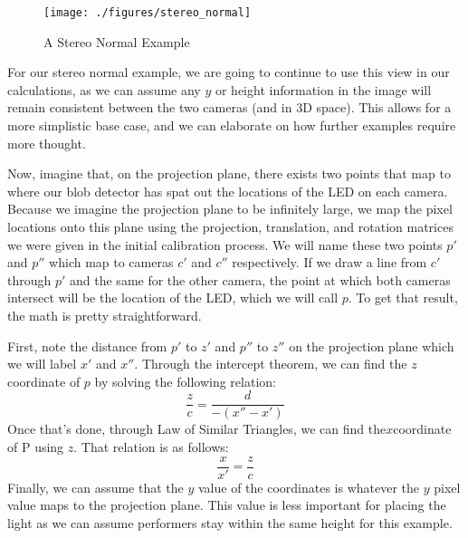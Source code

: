 \documentclass[
    12pt,
    twoside,
    bibstyle=chicago,
    headerstyle=uppercase,
	bibfile=thesis.bib
]{reedthesis}
\begin{document}
	\begin{figure}[h]
	   
	       \centering
	        
	    \texttt{[image: ./figures/stereo\_normal]}
	     \caption{A Stereo Normal Example}
	 \label{A Stereo Normal Example}
	\end{figure}

For our stereo normal example, we are going to continue to use this view in our calculations, as we can assume any $y$ or height information in the image will remain consistent between the two cameras (and in 3D space). This allows for a more simplistic base case, and we can elaborate on how further examples require more thought.

Now, imagine that, on the projection plane, there exists two points that map to where our blob detector has spat out the locations of the LED on each camera. Because we imagine the projection plane to be infinitely large, we map the pixel locations onto this plane using the projection, translation, and rotation matrices we were given in the initial calibration process. We will name these two points $p'$ and $p''$ which map to cameras $c'$ and $c''$ respectively. If we draw a line from $c'$ through $p'$ and the same for the other camera, the point at which both cameras intersect will be the location of the LED, which we will call $p$. To get that result, the math is pretty straightforward.

First, note the distance from $p'$ to $z'$ and $p''$ to $z''$ on the projection plane which we will label $x'$ and $x''$. Through the intercept theorem, we can find the $z$ coordinate of $p$ by solving the following relation:
\[\frac{z}{c} = \frac{d}{-(x'' - x')}\]
Once that's done, through Law of Similar Triangles, we can find the$x$coordinate of P using $z$. That relation is as follows:
\[\frac{x}{x'}=\frac{z}{c}\]
Finally, we can assume that the $y$ value of the coordinates is whatever the $y$ pixel value maps to the projection plane. This value is less important for placing the light as we can assume performers stay within the same height for this example.
\end{document}
